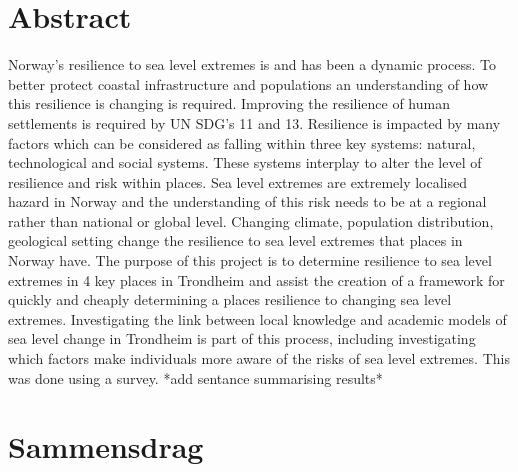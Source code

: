 

\section{Abstract}

Norway’s resilience to sea level extremes is and has been a dynamic process. To better protect coastal infrastructure and populations an understanding of how this resilience is changing is required. Improving the resilience of human settlements is required by UN SDG's 11 and 13. Resilience is impacted by many factors which can be considered as falling within three key systems:  natural, technological and social systems. These systems interplay to alter the level of resilience and risk within places. Sea level extremes are extremely localised hazard in Norway and the understanding of this risk needs to be at a regional rather than national or global level. Changing climate, population distribution, geological setting change the resilience to sea level extremes that places in Norway have. 
The purpose of this project is to determine resilience to sea level extremes in 4 key places in Trondheim and assist the creation of a framework for quickly and cheaply determining a places resilience to changing sea level extremes. Investigating the link between local knowledge and academic models of sea level change in Trondheim is part of this process, including investigating which factors make individuals more aware of the risks of sea level extremes. This was done using a survey. *add sentance summarising results*

\newpage
\section{Sammensdrag}


